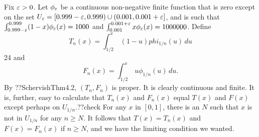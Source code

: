 Fix $\varepsilon>0$. Let $\phi_\varepsilon$ be a continuous non-negative finite function that is zero except on the set $U_\varepsilon=[0.999-\varepsilon,0.999)\cup (0.001,0.001+\varepsilon]$, 
and is such that $\int_{0.999-\varepsilon}^{0.999} (1-x) \phi_\varepsilon(x) = 1000$ and $\int_{0.001}^{0.001+\varepsilon} x \phi_\varepsilon(x) = 1000000$. 
Define 
$$
    T_n(x) = \int_{1/2}^x \, (1-u)phi_{1/n}(u) \, du
$$24
and 
$$
    F_n(x) = \int_{1/2}^x \, u \phi_{1/n}(u) \, du.
$$
By ??SchervishThm4.2, $(T_n,F_n)$ is proper. It is clearly continuous and finite. It is, further, easy to calculate that 
$T_n(x)$ and $F_n(x)$ equal $T(x)$ and $F(x)$ except perhaps on $U_{1/n}$.??check For any $x$ in $[0,1]$, there is an $N$
such that $x$ is not in $U_{1/n}$ for any $n\ge N$. It follows that $T(x)=T_n(x)$ and $F(x)=F_n(x)$ if $n\ge N$, and we have
the limiting condition we wanted.

\chaptertail 


